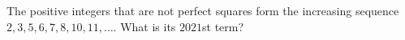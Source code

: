 The positive integers that are not perfect squares form the increasing sequence $2,3,5,6,7,8,10,11,\dots$. What is its $2021$st term?
